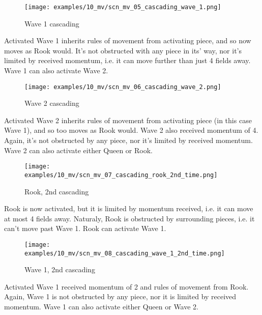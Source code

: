 \vspace*{0.05\textheight}
\noindent
\begin{wrapfigure}[12]{r}{0.5625\textwidth}
\centering
\texttt{[image: examples/10\_mv/scn\_mv\_05\_cascading\_wave\_1.png]}
\caption{Wave 1 cascading}
\label{fig:scn_mv_05_cascading_wave_1}
\end{wrapfigure}
Activated Wave 1 inherits rules of movement from activating piece, and so now
moves as Rook would. It's not obstructed with any piece in its' way, nor it's
limited by received momentum, i.e. it can move further than just 4 fields away.
Wave 1 can also activate Wave 2.

\clearpage %

\noindent
\begin{wrapfigure}[13]{l}{0.5625\textwidth}
\centering
\texttt{[image: examples/10\_mv/scn\_mv\_06\_cascading\_wave\_2.png]}
\caption{Wave 2 cascading}
\label{fig:scn_mv_06_cascading_wave_2}
\end{wrapfigure}
Activated Wave 2 inherits rules of movement from activating piece (in this
case Wave 1), and so too moves as Rook would. Wave 2 also received momentum
of 4. Again, it's not obstructed by any piece, nor it's limited by received
momentum. Wave 2 can also activate either Queen or Rook.

\vspace*{0.075\textheight}
\noindent
\begin{wrapfigure}[9]{r}{0.5625\textwidth}
\centering
\texttt{[image: examples/10\_mv/scn\_mv\_07\_cascading\_rook\_2nd\_time.png]}
\caption{Rook, 2nd cascading}
\label{fig:scn_mv_07_cascading_rook_2nd_time}
\end{wrapfigure}
Rook is now activated, but it is limited by momentum received, i.e. it can
move at most 4 fields away. Naturaly, Rook is obstructed by surrounding pieces,
i.e. it can't move past Wave 1. Rook can activate Wave 1.

\clearpage %

\noindent
\begin{wrapfigure}[10]{l}{0.5625\textwidth}
\centering
\texttt{[image: examples/10\_mv/scn\_mv\_08\_cascading\_wave\_1\_2nd\_time.png]}
\caption{Wave 1, 2nd cascading}
\label{fig:scn_mv_08_cascading_wave_1_2nd_time}
\end{wrapfigure}
Activated Wave 1 received momentum of 2 and rules of movement from Rook. Again,
Wave 1 is not obstructed by any piece, nor it is limited by received momentum.
Wave 1 can also activate either Queen or Wave 2.


